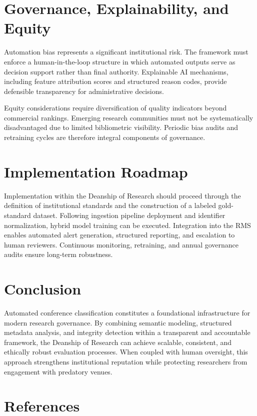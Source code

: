 \documentclass[11pt,a4paper]{article}
\begin{document}
\section{Governance, Explainability, and Equity}

Automation bias represents a significant institutional risk. The framework must
enforce a human-in-the-loop structure in which automated outputs serve as
decision support rather than final authority. Explainable AI mechanisms,
including feature attribution scores and structured reason codes, provide
defensible transparency for administrative decisions.

Equity considerations require diversification of quality indicators beyond
commercial rankings. Emerging research communities must not be systematically
disadvantaged due to limited bibliometric visibility. Periodic bias audits
and retraining cycles are therefore integral components of governance.

\section{Implementation Roadmap}

Implementation within the Deanship of Research should proceed through the
definition of institutional standards and the construction of a labeled
gold-standard dataset. Following ingestion pipeline deployment and identifier
normalization, hybrid model training can be executed. Integration into the
RMS enables automated alert generation, structured reporting, and escalation
to human reviewers. Continuous monitoring, retraining, and annual governance
audits ensure long-term robustness.

\section{Conclusion}

Automated conference classification constitutes a foundational infrastructure
for modern research governance. By combining semantic modeling, structured
metadata analysis, and integrity detection within a transparent and accountable
framework, the Deanship of Research can achieve scalable, consistent, and
ethically robust evaluation processes. When coupled with human oversight,
this approach strengthens institutional reputation while protecting researchers
from engagement with predatory venues.

\section*{References}
\end{document}
